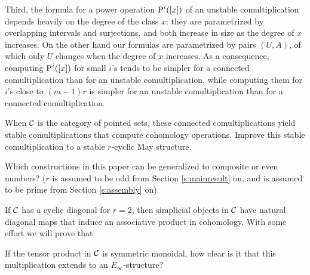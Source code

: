 Third, the formula for a power operation $\operatorname{P}^i([x])$ of an unstable comultiplication depends heavily on the degree of the class $x$: they are parametrized by overlapping intervals and surjections, and both increase in size as the degree of $x$ increases.
On the other hand our formulas are parametrized by pairs $(U,A)$, of which only $U$ changes when the degree of $x$ increases.
As a consequence, computing $\operatorname{P}^i([x])$ for small $i$'s tends to be simpler for a connected comultiplication than for an unstable comultiplication, while computing them for $i$'s close to $(m-1)r$ is simpler for an unstable comultiplication than for a connected comultiplication.
\begin{question}
	When $\mathcal{C}$ is the category of pointed sets, these connected comultiplications yield stable comultiplications that compute cohomology operations.
	Improve this stable comultiplication to a stable $r$-cyclic May structure.
\end{question}
\begin{question}
	Which constructions in this paper can be generalized to composite or even numbers? ($r$ is assumed to be odd from Section \ref{s:mainresult} on, and is assumed to be prime from Section \ref{s:assembly} on)
\end{question}
If $\mathcal{C}$ has a cyclic diagonal for $r= 2$, then simplicial objects in $\mathcal{C}$ have natural diagonal maps that induce an associative product in cohomology.
With some effort we will prove that


If the tensor product in $\mathcal{C}$ is symmetric monoidal, how clear is it that this multiplication extends to an $E_{\infty}$-structure? 

